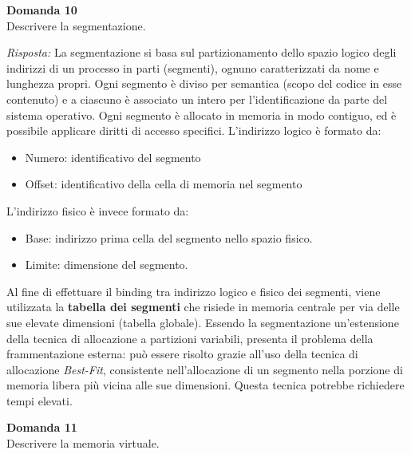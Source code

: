 \documentclass{article}
\newenvironment{problem}[2][Domanda]
    { \begin{mdframed}[backgroundcolor=gray!20] \textbf{#1 #2} \\}
    {  \end{mdframed}}
\newenvironment{solution}
    {\textit{Risposta:}}
    {}
\begin{document}
\begin{problem}{10}
Descrivere la segmentazione.
\end{problem}
\begin{solution}
La segmentazione si basa sul partizionamento dello spazio logico degli indirizzi di un processo in parti (segmenti), ognuno caratterizzati da nome e lunghezza propri.
\newline
Ogni segmento è diviso per semantica (scopo del codice in esse contenuto) e a ciascuno è associato un intero per l’identificazione da parte del sistema operativo.
\newline
Ogni segmento è allocato in memoria in modo contiguo, ed è possibile applicare diritti di accesso specifici.
\newline
\newline
L’indirizzo logico è formato da:
\begin{itemize}
    \item Numero: identificativo del segmento
    \item Offset: identificativo della cella di memoria nel segmento
\end{itemize}
L’indirizzo fisico è invece formato da:
\begin{itemize}
    \item Base: indirizzo prima cella del segmento nello spazio fisico.
    \item Limite: dimensione del segmento.
\end{itemize}
Al fine di effettuare il binding tra indirizzo logico e fisico dei segmenti, viene utilizzata la \textbf{tabella dei segmenti} che risiede in memoria centrale per via delle sue elevate dimensioni (tabella globale).
\newline
Essendo la segmentazione un’estensione della tecnica di allocazione a partizioni variabili, presenta il problema della frammentazione esterna: può essere risolto grazie all’uso della tecnica di allocazione \emph{Best-Fit}, consistente nell’allocazione di un segmento nella porzione di memoria libera più vicina alle sue dimensioni. 
\newline
Questa tecnica potrebbe richiedere tempi elevati.
\end{solution}
\begin{problem}{11}
Descrivere la memoria virtuale.
\end{problem}
\end{document}
